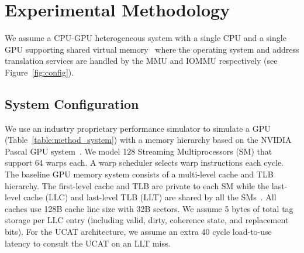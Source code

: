 
\section{Experimental Methodology}
\label{sec:method}

\noindent We assume a CPU-GPU heterogeneous system with a single CPU
and a single GPU supporting shared virtual memory~\cite{intelgen9,
amdzen} where the operating system and address translation services
are handled by the MMU and IOMMU respectively (see
Figure~\ref{fig:config}).



\subsection{System Configuration}

\noindent We use an industry proprietary performance simulator to
simulate a GPU (Table~\ref{table:method_system}) with a memory hierarchy
based on the NVIDIA Pascal GPU system~\cite{gpu_pascal}. We model 128
Streaming Multiprocessors (SM) that support 64 warps each. A warp
scheduler selects warp instructions each cycle. The baseline GPU
memory system consists of a multi-level cache and TLB hierarchy. The
first-level cache and TLB are private to each SM while the last-level
cache (LLC) and last-level TLB (LLT) are shared by all the SMs~\cite{SharedLLT}. All
caches use 128B cache line size with 32B sectors. We assume 5 bytes of
total tag storage per LLC entry (including valid, dirty, coherence
state, and replacement bits). For the UCAT architecture, we assume an
extra 40 cycle load-to-use latency to consult the UCAT on an LLT miss.


